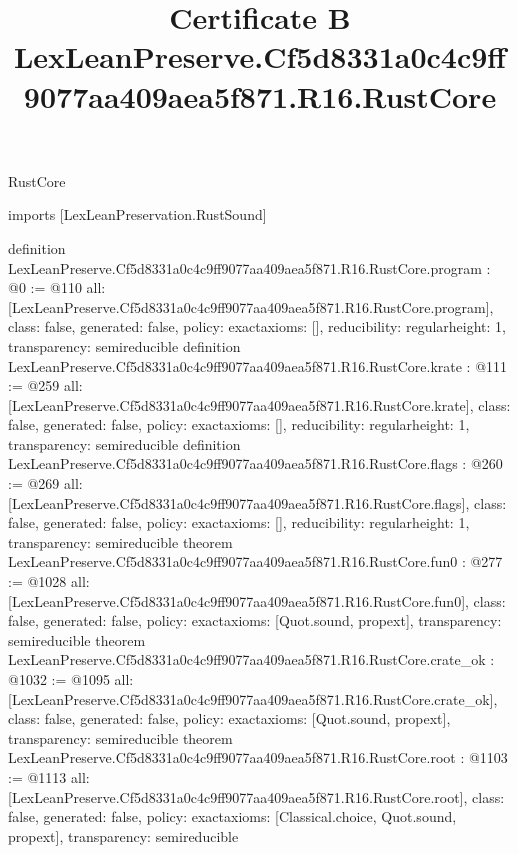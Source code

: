 \begin{lexlean}{RustCore}
\title{Certificate B LexLeanPreserve.Cf5d8331a0c4c9ff9077aa409aea5f871.R16.RustCore}
\begin{coremodule}
imports [LexLeanPreservation.RustSound]

definition LexLeanPreserve.Cf5d8331a0c4c9ff9077aa409aea5f871.R16.RustCore.program : @0 := @110 {
  all: [LexLeanPreserve.Cf5d8331a0c4c9ff9077aa409aea5f871.R16.RustCore.program],
  class: false,
  generated: false,
  policy: exact{axioms: []},
  reducibility: regular{height: 1},
  transparency: semireducible
}
definition LexLeanPreserve.Cf5d8331a0c4c9ff9077aa409aea5f871.R16.RustCore.krate : @111 := @259 {
  all: [LexLeanPreserve.Cf5d8331a0c4c9ff9077aa409aea5f871.R16.RustCore.krate],
  class: false,
  generated: false,
  policy: exact{axioms: []},
  reducibility: regular{height: 1},
  transparency: semireducible
}
definition LexLeanPreserve.Cf5d8331a0c4c9ff9077aa409aea5f871.R16.RustCore.flags : @260 := @269 {
  all: [LexLeanPreserve.Cf5d8331a0c4c9ff9077aa409aea5f871.R16.RustCore.flags],
  class: false,
  generated: false,
  policy: exact{axioms: []},
  reducibility: regular{height: 1},
  transparency: semireducible
}
theorem LexLeanPreserve.Cf5d8331a0c4c9ff9077aa409aea5f871.R16.RustCore.fun0 : @277 := @1028 {
  all: [LexLeanPreserve.Cf5d8331a0c4c9ff9077aa409aea5f871.R16.RustCore.fun0],
  class: false,
  generated: false,
  policy: exact{axioms: [Quot.sound, propext]},
  transparency: semireducible
}
theorem LexLeanPreserve.Cf5d8331a0c4c9ff9077aa409aea5f871.R16.RustCore.crate_ok : @1032 := @1095 {
  all: [LexLeanPreserve.Cf5d8331a0c4c9ff9077aa409aea5f871.R16.RustCore.crate_ok],
  class: false,
  generated: false,
  policy: exact{axioms: [Quot.sound, propext]},
  transparency: semireducible
}
theorem LexLeanPreserve.Cf5d8331a0c4c9ff9077aa409aea5f871.R16.RustCore.root : @1103 := @1113 {
  all: [LexLeanPreserve.Cf5d8331a0c4c9ff9077aa409aea5f871.R16.RustCore.root],
  class: false,
  generated: false,
  policy: exact{axioms: [Classical.choice, Quot.sound, propext]},
  transparency: semireducible
}


\end{coremodule}
\end{lexlean}
